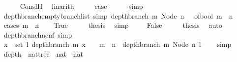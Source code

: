 \begin{isabellebody}
\ \ \ \ \isamarkupfalse%
\ Cons{\isachardot}IH\ \isamarkupfalse%
\ linarith\isanewline
\ \ \isamarkupfalse%
\ \isamarkupfalse%
\ {\isacharquery}case\isanewline
\ \ \ \ \isamarkupfalse%
\ simp\ \isanewline
{}\isamarkupfalse%
%
\endisatagproof
{\isafoldproof}%
%
\isadelimproof
\ \ \isanewline
%
\endisadelimproof
\isanewline
{}\isamarkupfalse%
\ depth{\isacharunderscore}branch{\isacharunderscore}empty{\isacharunderscore}branch{\isacharunderscore}list\ {\isacharbrackleft}simp{\isacharbrackright}{\isacharcolon}\ {\isachardoublequoteopen}depth{\isacharunderscore}branch\ m\ {\isacharparenleft}Node\ n\ {\isacharbrackleft}{\isacharbrackright}{\isacharparenright}\ {\isacharequal}\ of{\isacharunderscore}bool\ {\isacharparenleft}m\ {\isacharequal}\ n{\isacharparenright}{\isachardoublequoteclose}\ \ \ \ \isanewline
%
\isadelimproof
%
\endisadelimproof
%
\isatagproof
{}\isamarkupfalse%
\ {\isacharparenleft}cases\ {\isachardoublequoteopen}m\ {\isacharequal}\ n{\isachardoublequoteclose}{\isacharparenright}\isanewline
\ \ \isamarkupfalse%
\ True\isanewline
\ \ \isamarkupfalse%
\ \isamarkupfalse%
\ {\isacharquery}thesis\ \isamarkupfalse%
\ simp\ \isanewline
{}\isamarkupfalse%
\isanewline
\ \ \isamarkupfalse%
\ False\isanewline
\ \ \isamarkupfalse%
\ \isamarkupfalse%
\ {\isacharquery}thesis\ \isamarkupfalse%
\ auto\isanewline
{}\isamarkupfalse%
%
\endisatagproof
{\isafoldproof}%
%
\isadelimproof
\isanewline
%
\endisadelimproof
\ \ \isanewline
{}\isamarkupfalse%
\ depth{\isacharunderscore}branch{\isacharunderscore}ne{\isacharunderscore}nf\ {\isacharbrackleft}simp{\isacharbrackright}{\isacharcolon}\ \isanewline
{\isachardoublequoteopen}{\isacharparenleft}{\isasymforall}\ x\ {\isasymin}\ set\ l{\isachardot}\ depth{\isacharunderscore}branch\ m\ x\ {\isacharequal}\ {}{\isacharparenright}\ {\isasymand}\ m\ {\isasymnoteq}\ n\ {\isasymlongrightarrow}\ depth{\isacharunderscore}branch\ m\ {\isacharparenleft}Node\ n\ l{\isacharparenright}\ {\isacharequal}\ {}{\isachardoublequoteclose}\ \isanewline
%
\isadelimproof
%
\endisadelimproof
%
\isatagproof
{}\isamarkupfalse%
\ simp%
\endisatagproof
{\isafoldproof}%
%
\isadelimproof
\isanewline
%
\endisadelimproof
\ \ \isanewline
{}\isamarkupfalse%
\ depth\ {\isacharcolon}{\isacharcolon}\ {\isachardoublequoteopen}nattree\ {\isasymRightarrow}\ nat\ {\isasymRightarrow}\ nat{\isachardoublequoteclose}\ \isanewline

\end{isabellebody}
